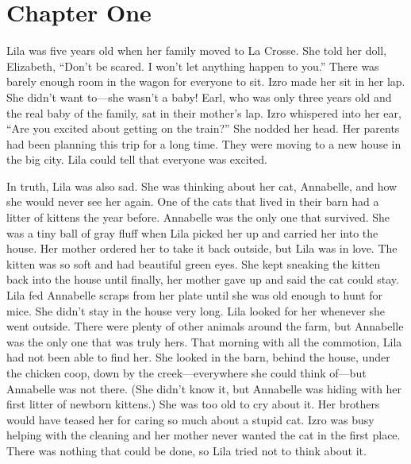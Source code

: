\documentclass[
  letterpaper,
]{book}
\begin{document}

\chapter{Chapter One}\label{chapter-one}

Lila was five years old when her family moved to La Crosse. She told her
doll, Elizabeth, ``Don't be scared. I won't let anything happen to
you.'' There was barely enough room in the wagon for everyone to sit.
Izro made her sit in her lap. She didn't want to---she wasn't a baby!
Earl, who was only three years old and the real baby of the family, sat
in their mother's lap. Izro whispered into her ear, ``Are you excited
about getting on the train?'' She nodded her head. Her parents had been
planning this trip for a long time. They were moving to a new house in
the big city. Lila could tell that everyone was excited.

In truth, Lila was also sad. She was thinking about her cat, Annabelle,
and how she would never see her again. One of the cats that lived in
their barn had a litter of kittens the year before. Annabelle was the
only one that survived. She was a tiny ball of gray fluff when Lila
picked her up and carried her into the house. Her mother ordered her to
take it back outside, but Lila was in love. The kitten was so soft and
had beautiful green eyes. She kept sneaking the kitten back into the
house until finally, her mother gave up and said the cat could stay.
Lila fed Annabelle scraps from her plate until she was old enough to
hunt for mice. She didn't stay in the house very long. Lila looked for
her whenever she went outside. There were plenty of other animals around
the farm, but Annabelle was the only one that was truly hers. That
morning with all the commotion, Lila had not been able to find her. She
looked in the barn, behind the house, under the chicken coop, down by
the creek---everywhere she could think of---but Annabelle was not there.
(She didn't know it, but Annabelle was hiding with her first litter of
newborn kittens.) She was too old to cry about it. Her brothers would
have teased her for caring so much about a stupid cat. Izro was busy
helping with the cleaning and her mother never wanted the cat in the
first place. There was nothing that could be done, so Lila tried not to
think about it.
\end{document}

